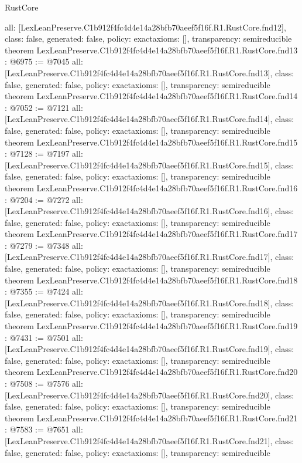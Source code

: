 \begin{lexlean}{RustCore}
\begin{coremodule}
{  all: [LexLeanPreserve.C1b912f4fc4d4e14a28bfb70aeef5f16f.R1.RustCore.fnd12],
  class: false,
  generated: false,
  policy: exact{axioms: []},
  transparency: semireducible
}
theorem LexLeanPreserve.C1b912f4fc4d4e14a28bfb70aeef5f16f.R1.RustCore.fnd13 : @6975 := @7045 {
  all: [LexLeanPreserve.C1b912f4fc4d4e14a28bfb70aeef5f16f.R1.RustCore.fnd13],
  class: false,
  generated: false,
  policy: exact{axioms: []},
  transparency: semireducible
}
theorem LexLeanPreserve.C1b912f4fc4d4e14a28bfb70aeef5f16f.R1.RustCore.fnd14 : @7052 := @7121 {
  all: [LexLeanPreserve.C1b912f4fc4d4e14a28bfb70aeef5f16f.R1.RustCore.fnd14],
  class: false,
  generated: false,
  policy: exact{axioms: []},
  transparency: semireducible
}
theorem LexLeanPreserve.C1b912f4fc4d4e14a28bfb70aeef5f16f.R1.RustCore.fnd15 : @7128 := @7197 {
  all: [LexLeanPreserve.C1b912f4fc4d4e14a28bfb70aeef5f16f.R1.RustCore.fnd15],
  class: false,
  generated: false,
  policy: exact{axioms: []},
  transparency: semireducible
}
theorem LexLeanPreserve.C1b912f4fc4d4e14a28bfb70aeef5f16f.R1.RustCore.fnd16 : @7204 := @7272 {
  all: [LexLeanPreserve.C1b912f4fc4d4e14a28bfb70aeef5f16f.R1.RustCore.fnd16],
  class: false,
  generated: false,
  policy: exact{axioms: []},
  transparency: semireducible
}
theorem LexLeanPreserve.C1b912f4fc4d4e14a28bfb70aeef5f16f.R1.RustCore.fnd17 : @7279 := @7348 {
  all: [LexLeanPreserve.C1b912f4fc4d4e14a28bfb70aeef5f16f.R1.RustCore.fnd17],
  class: false,
  generated: false,
  policy: exact{axioms: []},
  transparency: semireducible
}
theorem LexLeanPreserve.C1b912f4fc4d4e14a28bfb70aeef5f16f.R1.RustCore.fnd18 : @7355 := @7424 {
  all: [LexLeanPreserve.C1b912f4fc4d4e14a28bfb70aeef5f16f.R1.RustCore.fnd18],
  class: false,
  generated: false,
  policy: exact{axioms: []},
  transparency: semireducible
}
theorem LexLeanPreserve.C1b912f4fc4d4e14a28bfb70aeef5f16f.R1.RustCore.fnd19 : @7431 := @7501 {
  all: [LexLeanPreserve.C1b912f4fc4d4e14a28bfb70aeef5f16f.R1.RustCore.fnd19],
  class: false,
  generated: false,
  policy: exact{axioms: []},
  transparency: semireducible
}
theorem LexLeanPreserve.C1b912f4fc4d4e14a28bfb70aeef5f16f.R1.RustCore.fnd20 : @7508 := @7576 {
  all: [LexLeanPreserve.C1b912f4fc4d4e14a28bfb70aeef5f16f.R1.RustCore.fnd20],
  class: false,
  generated: false,
  policy: exact{axioms: []},
  transparency: semireducible
}
theorem LexLeanPreserve.C1b912f4fc4d4e14a28bfb70aeef5f16f.R1.RustCore.fnd21 : @7583 := @7651 {
  all: [LexLeanPreserve.C1b912f4fc4d4e14a28bfb70aeef5f16f.R1.RustCore.fnd21],
  class: false,
  generated: false,
  policy: exact{axioms: []},
  transparency: semireducible
}
\end{coremodule}
\end{lexlean}
